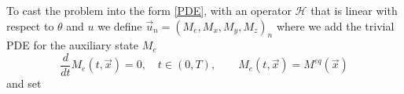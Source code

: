 \documentclass[12pt]{article}
\newcommand\skipgradient[1]{}
\newcommand\HH{\mathcal{H}}
\newcommand\vecr{\vec{x}}
\begin{document}
\skipgradient{
Alternatively, assuming $\vec{g}(t)\equiv \vec{g}_0$, we can use the setting
\begin{equation}\label{eqn:bloch-torrey-rot-defs-g0}
\begin{aligned}
&B^1(t, \vecr)=
\begin{pmatrix} p(t)c^+_{x}(\vecr)\\p(t)c^+_{y}(\vecr)\\0
\end{pmatrix},
\quad 
R(\vecr)=
\begin{pmatrix}
R_\perp(\vecr)&-\gamma(\delta B^0(\vecr)+\vecr \cdot \vec{g}_0)&0\\
\gamma(\delta B^0(\vecr)+\vecr \cdot \vec{g}_0)&R_\perp(\vecr)&0\\
0&0&R_z(\vecr)
\end{pmatrix}
\end{aligned}
\end{equation}
}
To cast the problem into the form \eqref{PDE}, with an operator $\HH$ that is linear with respect to $\theta$ and $u$ we define 
$\vec{u}_n=(M_e,M_x,M_y,M_z)_n$ where we add the trivial PDE for the auxiliary state $M_e$ 
\[
\frac{d}{dt} M_e(t, \vecr)=0, \quad t\in(0,T), \qquad M_e(t, \vecr)=M^{eq}(\vecr)
\]
and set 
\end{document}
